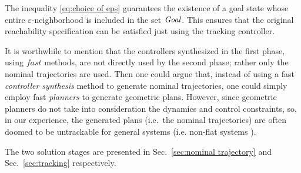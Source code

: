 The inequality \eqref{eq:choice of eps} guarantees the existence of a goal state whose entire $\varepsilon$-neighborhood is included in the set $\mathit{Goal}$.
This ensures that the original reachability specification can be satisfied just using the tracking controller.

It is worthwhile to mention that the controllers synthesized in the first phase, using $\mathit{fast}$ methods, are not directly used by the second phase; rather only the nominal trajectories are used.
Then one could argue that, instead of using a fast \emph{controller synthesis} method to generate nominal trajectories, one could simply employ fast \emph{planners} \cite{rrt etc.} to generate geometric plans.
However, since geometric planners do not take into consideration the dynamics and control constraints, so, in our experience, the generated plans (i.e.\ the nominal trajectories) are often doomed to be untrackable for general systems (i.e. non-flat systems ).%


The two solution stages are presented in Sec.~\ref{sec:nominal trajectory} and Sec.~\ref{sec:tracking} respectively.







